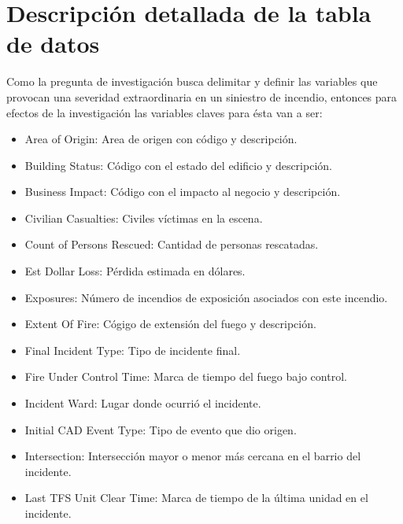 \documentclass[
  oneside]{memoir}
\begin{document}
\section{Descripción detallada de la tabla de datos}

Como la pregunta de investigación busca delimitar y definir las
variables que provocan una severidad extraordinaria en un siniestro de
incendio, entonces para efectos de la investigación las variables claves
para ésta van a ser:

\begin{itemize}
\item Area of Origin: Area de origen con código y descripción.

\item Building Status: Código con el estado del edificio y descripción.

\item Business Impact: Código con el impacto al negocio y descripción.

\item Civilian Casualties: Civiles víctimas en la escena.

\item Count of Persons Rescued: Cantidad de personas rescatadas.

\item Est Dollar Loss: Pérdida estimada en dólares.

\item Exposures: Número de incendios de exposición asociados con este incendio.

\item Extent Of Fire: Cógigo de extensión del fuego y descripción.

\item Final Incident Type: Tipo de incidente final.

\item Fire Under Control Time: Marca de tiempo del fuego bajo control.

\item Incident Ward: Lugar donde ocurrió el incidente.

\item Initial CAD Event Type: Tipo de evento que dio origen.

\item Intersection: Intersección mayor o menor más cercana en el barrio del incidente.

\item Last TFS Unit Clear Time: Marca de tiempo de la última unidad en el
incidente.


\end{itemize}
\end{document}
